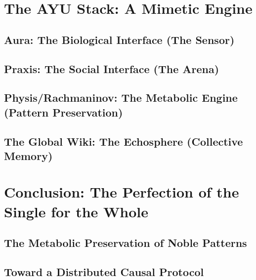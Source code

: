 \documentclass[12pt,a4paper]{report}
\begin{document}
\chapter{The AYU Stack: A Mimetic Engine}
\section{Aura: The Biological Interface (The Sensor)}
\section{Praxis: The Social Interface (The Arena)}
\section{Physis/Rachmaninov: The Metabolic Engine (Pattern Preservation)}
\section{The Global Wiki: The Echosphere (Collective Memory)}

\chapter{Conclusion: The Perfection of the Single for the Whole}
\section{The Metabolic Preservation of Noble Patterns}
\section{Toward a Distributed Causal Protocol}
\end{document}
